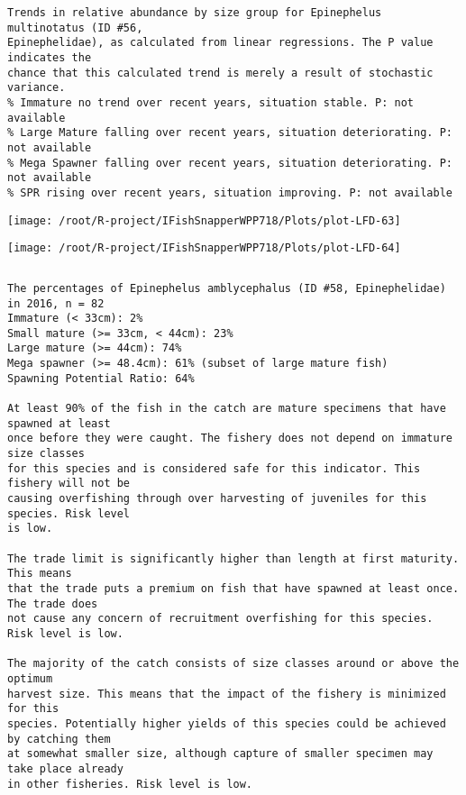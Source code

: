 \documentclass{report}\usepackage[]{graphicx}\usepackage[]{color}
\makeatletter
\def\maxwidth{ %
  \ifdim\Gin@nat@width>\linewidth
    \linewidth
  \else
    \Gin@nat@width
  \fi
}
\newenvironment{kframe}{%
 \def\at@end@of@kframe{}%
 \ifinner\ifhmode%
  \def\at@end@of@kframe{\end{minipage}}%
  \begin{minipage}{\columnwidth}%
 \fi\fi%
 \def\FrameCommand##1{\hskip\@totalleftmargin \hskip-\fboxsep
 \colorbox{shadecolor}{##1}\hskip-\fboxsep
     \hskip-\linewidth \hskip-\@totalleftmargin \hskip\columnwidth}%
 \MakeFramed {\advance\hsize-\width
   \@totalleftmargin\z@ \linewidth\hsize
   \@setminipage}}%
 {\par\unskip\endMakeFramed%
 \at@end@of@kframe}
\newenvironment{knitrout}{}{} %
\makeatother
\begin{document}
\begin{knitrout}
\begin{kframe}
\begin{verbatim}
Trends in relative abundance by size group for Epinephelus multinotatus (ID #56,
Epinephelidae), as calculated from linear regressions. The P value indicates the
chance that this calculated trend is merely a result of stochastic variance.
% Immature no trend over recent years, situation stable. P: not available
% Large Mature falling over recent years, situation deteriorating. P: not available
% Mega Spawner falling over recent years, situation deteriorating. P: not available
% SPR rising over recent years, situation improving. P: not available
\end{verbatim}
\end{kframe}
\texttt{[image: /root/R-project/IFishSnapperWPP718/Plots/plot-LFD-63]} 

\texttt{[image: /root/R-project/IFishSnapperWPP718/Plots/plot-LFD-64]} 
\begin{kframe}\begin{verbatim}
\end{verbatim}
\end{kframe}
\clearpage
\newpage
\begin{kframe}\begin{verbatim}The percentages of Epinephelus amblycephalus (ID #58, Epinephelidae) in 2016, n = 82
Immature (< 33cm): 2%
Small mature (>= 33cm, < 44cm): 23%
Large mature (>= 44cm): 74%
Mega spawner (>= 48.4cm): 61% (subset of large mature fish)
Spawning Potential Ratio: 64%
 
At least 90% of the fish in the catch are mature specimens that have spawned at least
once before they were caught. The fishery does not depend on immature size classes
for this species and is considered safe for this indicator. This fishery will not be
causing overfishing through over harvesting of juveniles for this species. Risk level
is low.

The trade limit is significantly higher than length at first maturity.  This means
that the trade puts a premium on fish that have spawned at least once. The trade does
not cause any concern of recruitment overfishing for this species. Risk level is low.

The majority of the catch consists of size classes around or above the optimum
harvest size. This means that the impact of the fishery is minimized for this
species. Potentially higher yields of this species could be achieved by catching them
at somewhat smaller size, although capture of smaller specimen may take place already
in other fisheries. Risk level is low.


\end{verbatim}
\end{kframe}
\end{knitrout}
\end{document}

